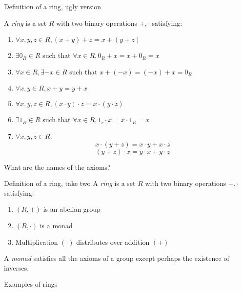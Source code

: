 \documentclass{beamer}
\begin{document}
\begin{frame}{Definition of a ring, ugly version}

A \emph{ring} is a set $R$ with two binary operations $+, \cdot$ satisfying:

\begin{enumerate}
\item $\forall x, y,z\in R, (x+y)+z=x+(y+z)$
\item $\exists 0_R\in R$ such that $\forall x\in R,  0_R+x=x+0_R=x$
\item $\forall x\in R, \exists {-x}\in R$ such that $x+({-x})=({-x})+x=0_R$
\item $\forall x,y \in R, x+y=y+x$
\item $\forall x, y,z\in R, (x\cdot y)\cdot z=x\cdot (y\cdot z)$
\item $\exists 1_R\in R$ such that $\forall x\in R, 1_r\cdot x=x\cdot 1_R=x$
\item $\forall x, y,z\in R$:
$$x\cdot (y+z)=x\cdot y+x\cdot z$$ 
$$(y+z)\cdot x=y\cdot x+ y\cdot z$$
\end{enumerate}

\begin{block}{What are the names of the axioms?}\end{block}

\end{frame}

\begin{frame}{Definition of a ring, take two}
A \emph{ring} is a set $R$ with two binary operations $+,\cdot$ satisfying:

\begin{enumerate}
\item $(R,+)$ is an abelian group
\item $(R,\cdot)$ is a monad
\item Multiplication $(\cdot)$ distributes over addition $(+)$
\end{enumerate}

A \emph{monad} satisfies all the axioms of a group except perhaps the existence of inverses.
\end{frame}

\begin{frame}[plain,c]

\begin{center}

\Huge

Examples of rings
\end{center}

\end{frame}
\end{document}
